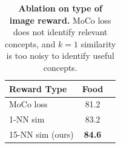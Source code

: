 


\begin{table}[h]
    \centering
    \begin{tabular}{lcc}
        \toprule
        Reward Type & Food \\
        \midrule
        MoCo loss & 81.2 \\
        1-NN sim  & 83.2 \\
        15-NN sim (ours) & \textbf{84.6} \\
        \bottomrule
    \end{tabular}
    \caption{\textbf{Ablation on type of image reward.}
    MoCo loss does not identify relevant concepts, and $k=1$ similarity is too noisy to identify useful concepts. }
    \label{tab:image_reward}
\end{table}


